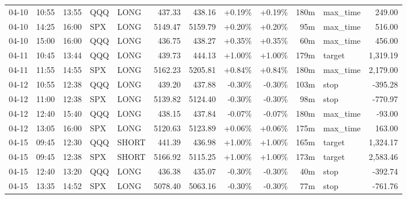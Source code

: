 \documentclass[11pt,a4paper,twoside]{article}
\begin{document}
\begin{center}
\begin{longtable}{>{\color{txtmain}}l l l l l r r r r r >{\color{txtmain}}l r}
04-10 & 10:55 & 13:55 & QQQ & LONG & 437.33 & 438.16 & \textcolor{wingreen}{+0.19\%} & \textcolor{wingreen}{+0.19\%} & 180m & max\_time & \textcolor{wingreen}{249.00} \\
04-10 & 14:25 & 16:00 & SPX & LONG & 5149.47 & 5159.79 & \textcolor{wingreen}{+0.20\%} & \textcolor{wingreen}{+0.20\%} & 95m & max\_time & \textcolor{wingreen}{516.00} \\
04-10 & 15:00 & 16:00 & QQQ & LONG & 436.75 & 438.27 & \textcolor{wingreen}{+0.35\%} & \textcolor{wingreen}{+0.35\%} & 60m & max\_time & \textcolor{wingreen}{456.00} \\
04-11 & 10:45 & 13:44 & QQQ & LONG & 439.73 & 444.13 & \textcolor{wingreen}{+1.00\%} & \textcolor{wingreen}{+1.00\%} & 179m & target & \textcolor{wingreen}{1,319.19} \\
04-11 & 11:55 & 14:55 & SPX & LONG & 5162.23 & 5205.81 & \textcolor{wingreen}{+0.84\%} & \textcolor{wingreen}{+0.84\%} & 180m & max\_time & \textcolor{wingreen}{2,179.00} \\
04-12 & 10:55 & 12:38 & QQQ & LONG & 439.20 & 437.88 & \textcolor{lossred}{-0.30\%} & \textcolor{lossred}{-0.30\%} & 103m & stop & \textcolor{lossred}{-395.28} \\
04-12 & 11:00 & 12:38 & SPX & LONG & 5139.82 & 5124.40 & \textcolor{lossred}{-0.30\%} & \textcolor{lossred}{-0.30\%} & 98m & stop & \textcolor{lossred}{-770.97} \\
04-12 & 12:40 & 15:40 & QQQ & LONG & 438.15 & 437.84 & \textcolor{lossred}{-0.07\%} & \textcolor{lossred}{-0.07\%} & 180m & max\_time & \textcolor{lossred}{-93.00} \\
04-12 & 13:05 & 16:00 & SPX & LONG & 5120.63 & 5123.89 & \textcolor{wingreen}{+0.06\%} & \textcolor{wingreen}{+0.06\%} & 175m & max\_time & \textcolor{wingreen}{163.00} \\
04-15 & 09:45 & 12:30 & QQQ & SHORT & 441.39 & 436.98 & \textcolor{wingreen}{+1.00\%} & \textcolor{wingreen}{+1.00\%} & 165m & target & \textcolor{wingreen}{1,324.17} \\
04-15 & 09:45 & 12:38 & SPX & SHORT & 5166.92 & 5115.25 & \textcolor{wingreen}{+1.00\%} & \textcolor{wingreen}{+1.00\%} & 173m & target & \textcolor{wingreen}{2,583.46} \\
04-15 & 12:40 & 13:20 & QQQ & LONG & 436.38 & 435.07 & \textcolor{lossred}{-0.30\%} & \textcolor{lossred}{-0.30\%} & 40m & stop & \textcolor{lossred}{-392.74} \\
04-15 & 13:35 & 14:52 & SPX & LONG & 5078.40 & 5063.16 & \textcolor{lossred}{-0.30\%} & \textcolor{lossred}{-0.30\%} & 77m & stop & \textcolor{lossred}{-761.76} \\

\end{longtable}
\end{center}
\end{document}
